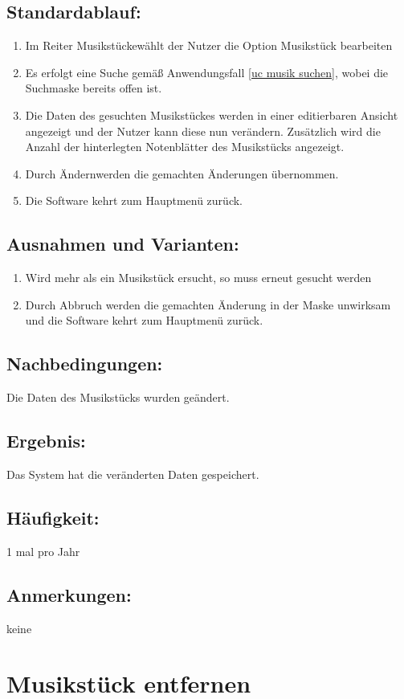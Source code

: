 \documentclass[a4paper,10pt]{scrartcl}
\begin{document}
\subsection{Standardablauf:}
\begin{enumerate}
	\item Im Reiter \glqq Musikstücke\grqq wählt der Nutzer die Option \glqq Musikstück bearbeiten\grqq
	\item Es erfolgt eine Suche gemäß Anwendungsfall \ref{uc musik suchen}, wobei die Suchmaske bereits offen ist.
	\item Die Daten des gesuchten Musikstückes werden in einer editierbaren Ansicht angezeigt und der Nutzer kann diese nun verändern. Zusätzlich wird die Anzahl der hinterlegten Notenblätter des Musikstücks angezeigt.\label{musik bearbeiten suche}
	\item Durch \glqq Ändern\grqq werden die gemachten Änderungen übernommen.
	\item Die Software kehrt zum Hauptmenü zurück.
	\end{enumerate}
\subsection{Ausnahmen und Varianten:}
	\begin{enumerate}
	\item Wird mehr als ein Musikstück ersucht, so muss erneut gesucht werden
	\item Durch Abbruch werden die gemachten Änderung in der Maske unwirksam und die Software kehrt zum Hauptmenü zurück.
\end{enumerate}
\subsection{Nachbedingungen:}
Die Daten des Musikstücks wurden geändert.
\subsection{Ergebnis:}
Das System hat die veränderten Daten gespeichert.
\subsection{Häufigkeit:}
1 mal pro Jahr
\subsection{Anmerkungen:}
keine
\newpage

\section{Musikstück entfernen}
\label{uc musik entfernen}
\end{document}
